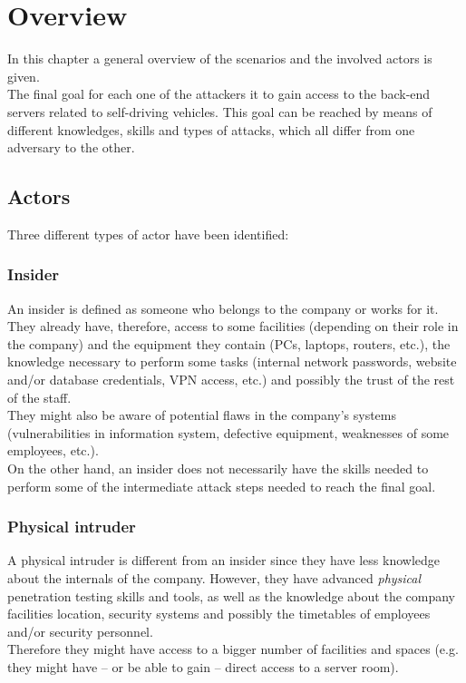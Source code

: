 %
\chapter{Overview}\label{ch:overview}

In this chapter a general overview of the scenarios and the involved actors is given.\\
The final goal for each one of the attackers it to gain access to the back-end servers related to self-driving vehicles. This goal can be reached by means of different knowledges, skills and types of attacks, which all differ from one adversary to the other.

\section{Actors}
\noindent Three different types of actor have been identified:

\subsection*{Insider}
An insider is defined as someone who belongs to the company or works for it. They already have, therefore, access to some facilities (depending on their role in the company) and the equipment they contain (PCs, laptops, routers, etc.), the knowledge necessary to perform some tasks (internal network passwords, website and/or database credentials, VPN access, etc.) and possibly the trust of the rest of the staff.\\
They might also be aware of potential flaws in the company's systems (vulnerabilities in information system, defective equipment, weaknesses of some employees, etc.).\\
On the other hand, an insider does not necessarily have the skills needed to perform some of the intermediate attack steps needed to reach the final goal.

\subsection*{Physical intruder}
A physical intruder is different from an insider since they have less knowledge about the internals of the company. However, they have advanced \textit{physical} penetration testing skills and tools, as well as the knowledge about the company facilities location, security systems and possibly the timetables of employees and/or security personnel.\\
Therefore they might have access to a bigger number of facilities and spaces (e.g. they might have -- or be able to gain -- direct access to a server room).

